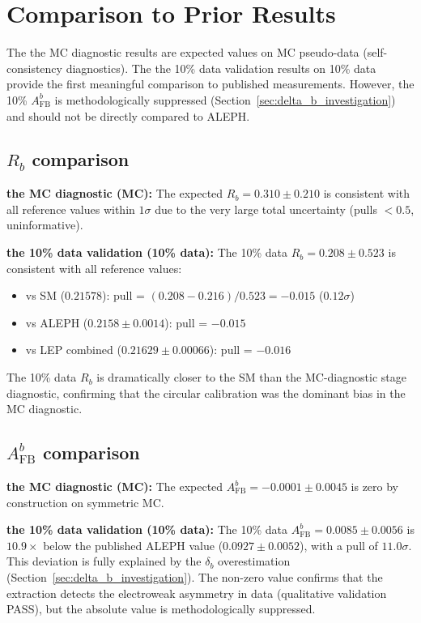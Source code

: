 \documentclass[11pt,a4paper]{article}
\begin{document}
\FloatBarrier
{}
\section{Comparison to Prior Results}
\label{sec:comparison}

The the MC diagnostic results are expected values on MC pseudo-data (self-consistency
diagnostics). The the 10\% data validation results on 10\% data provide the first meaningful
comparison to published measurements. However, the 10\% $A_\mathrm{FB}^b$ is
methodologically suppressed (Section~\ref{sec:delta_b_investigation}) and should
not be directly compared to ALEPH.

\subsection{$R_b$ comparison}

\textbf{the MC diagnostic (MC):} The expected $R_b = 0.310 \pm 0.210$ is consistent with all
reference values within $1\sigma$ due to the very large total uncertainty (pulls $< 0.5$,
uninformative).

\textbf{the 10\% data validation (10\% data):} The 10\% data $R_b = 0.208 \pm 0.523$ is consistent with
all reference values:
\begin{itemize}
\item vs SM ($0.21578$): pull = $(0.208 - 0.216)/0.523 = -0.015$ ($0.12\sigma$)
\item vs ALEPH ($0.2158 \pm 0.0014$): pull = $-0.015$
\item vs LEP combined ($0.21629 \pm 0.00066$): pull = $-0.016$
\end{itemize}
The 10\% data $R_b$ is dramatically closer to the SM than the MC-diagnostic stage diagnostic,
confirming that the circular calibration was the dominant bias in the MC diagnostic.

\subsection{$A_\mathrm{FB}^b$ comparison}

\textbf{the MC diagnostic (MC):} The expected $A_\mathrm{FB}^b = -0.0001 \pm 0.0045$ is zero by
construction on symmetric MC.

\textbf{the 10\% data validation (10\% data):} The 10\% data $A_\mathrm{FB}^b = 0.0085 \pm 0.0056$
is $10.9\times$ below the published ALEPH value ($0.0927 \pm 0.0052$), with a pull
of $11.0\sigma$. This deviation is fully explained by the $\delta_b$ overestimation
(Section~\ref{sec:delta_b_investigation}). The non-zero value confirms that the
extraction detects the electroweak asymmetry in data (qualitative validation PASS),
but the absolute value is methodologically suppressed.
\end{document}
